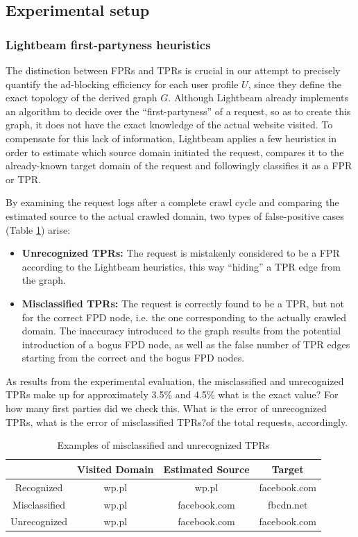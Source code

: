 \documentclass{sig-alternate}
\begin{document}
\subsection{Experimental setup}

\subsubsection{Lightbeam first-partyness heuristics}
The distinction between FPRs and TPRs is crucial in our attempt to precisely quantify the ad-blocking efficiency for each user profile $U$, since they define the exact topology of the derived graph $G$. Although Lightbeam already implements an algorithm to decide over the ``first-partyness'' of a request, so as to create this graph, it does not have the exact knowledge of the actual website visited. To compensate for this lack of information, Lightbeam applies a few heuristics in order to estimate which source domain initiated the request, compares it to the already-known target domain of the request and followingly classifies it as a FPR or TPR.

By examining the request logs after a complete crawl cycle and comparing the estimated source to the actual crawled domain, two types of false-positive cases (Table \ref{table:false_positive_examples}) arise:

\begin{itemize}
\item \textbf{Unrecognized TPRs:} The request is mistakenly considered to be a FPR according to the Lightbeam heuristics, this way ``hiding'' a TPR edge from the graph.
\item \textbf{Misclassified TPRs:} The request is correctly found to be a TPR, but not for the correct FPD node, i.e. the one corresponding to the actually crawled domain. The inaccuracy introduced to the graph results from the potential introduction of a bogus FPD node, as well as the false number of TPR edges starting from the correct and the bogus FPD nodes.
\end{itemize}

As results from the experimental evaluation, the misclassified and unrecognized TPRs make up for approximately 3.5\% and 4.5\% {\color{red}what is the exact value? For how many first parties did we check this. What is the error of unrecognized TPRs, what is the error of misclassified TPRs?}of the total requests, accordingly.

\begin{table}
\centering
\small
\begin{tabular}{|c|c c c|}
\hline
& Visited Domain & Estimated Source & Target \\
\hline
Recognized & wp.pl & wp.pl & facebook.com \\
Misclassified & wp.pl & facebook.com & fbcdn.net \\
Unrecognized & wp.pl & facebook.com & facebook.com \\
\hline
\end{tabular}
\label{table:false_positive_examples}
\caption{Examples of misclassified and unrecognized TPRs}
\end{table}
\end{document}
